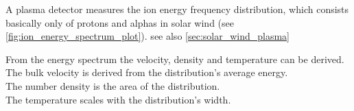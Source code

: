 A plasma detector measures the ion energy frequency distribution, which consists basically only of protons and alphas in solar wind (see \autoref{fig:ion_energy_spectrum_plot}). see also \autoref{sec:solar_wind_plasma}
\\
\begin{figure}[htb]
\end{figure}

From the energy spectrum the velocity, density and temperature can be derived.\\

The bulk velocity is derived from the distribution's average energy.\\
The number density is the area of the distribution.\\
The temperature scales with the distribution's width.\\



